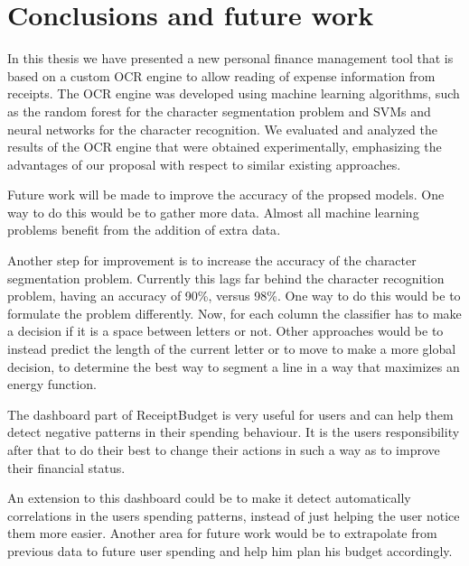 \chapter{Conclusions and future work}
\label{chap:conclusion}
In this thesis we have presented a new personal finance management tool that is based on a custom OCR engine to allow reading of expense information from receipts. The OCR engine was developed using machine learning algorithms, such as the random forest for the character segmentation problem and SVMs and neural networks for the character recognition. We evaluated and analyzed the results of the OCR engine that were obtained experimentally, emphasizing the advantages of our proposal with respect to similar existing approaches. 

Future work will be made to improve the accuracy of the propsed models. One way to do this would be to gather more data. Almost all machine learning problems benefit from the addition of extra data\cite{halevy2009unreasonable}.

Another step for improvement is to increase the accuracy of the character segmentation problem. Currently this lags far behind the character recognition problem, having an accuracy of 90\%, versus 98\%. One way to do this would be to formulate the problem differently. Now, for each column the classifier has to make a decision if it is a space between letters or not. Other approaches would be to instead predict the length of the current letter or to move to make a more global decision, to determine the best way to segment a line in a way that maximizes an energy function.

The dashboard part of ReceiptBudget is very useful for users and can help them detect negative patterns in their spending behaviour. It is the users responsibility after that to do their best to change their actions in such a way as to improve their financial status. 

An extension to this dashboard could be to make it detect automatically correlations in the users spending patterns, instead of just helping the user notice them more easier. Another area for future work would be to extrapolate from previous data to future user spending and help him plan his budget accordingly.
